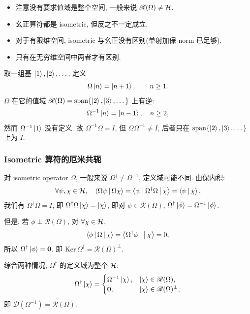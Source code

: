 \begin{itemize}
    \item 注意没有要求值域是整个空间, 一般来说 $\mathscr R(\Omega)\neq \mathcal{H}$.
    \item 幺正算符都是 isometric, 但反之不一定成立.
    \item 对于有限维空间, isometric 与幺正没有区别(单射加保 norm 已足够).
    \item 只有在无穷维空间中两者才有区别.
\end{itemize}

\begin{example}[单边平移算符]
取一组基 $\ket 1,\ket 2,\dots$, 定义
\begin{equation}
\Omega\ket n=\ket{n+1},\qquad n\geq 1.
\end{equation}
$\Omega$ 在它的值域 $\mathscr R(\Omega)=\mathrm{span}\{\ket 2,\ket 3,\dots\}$ 上有逆:
\begin{equation}
\Omega^{-1}\ket n=\ket{n-1},\quad n\geq 2,
\end{equation}
然而 $\Omega^{-1}\ket 1$ 没有定义. 故 $\Omega^{-1}\Omega=I$, 但 $\Omega\Omega^{-1}\neq I$, 后者只在 $\mathrm{span}\{\ket 2,\ket 3,\dots\}$ 上为 $I$.
\end{example}

\subsubsection{Isometric 算符的厄米共轭}

对 isometric operator $\Omega$, 一般来说 $\Omega^{\dagger}\neq \Omega^{-1}$, 定义域可能不同. 由保内积:
\begin{equation}
\forall \psi,\chi\in\mathcal{H},\quad\left\langle \Omega\psi \,\middle|\, \Omega\chi \right\rangle=\left\langle \psi \,\middle|\, \Omega^{\dagger}\Omega \,\middle|\, \chi \right\rangle=\left\langle \psi \,\middle|\, \chi \right\rangle,
\end{equation}
我们有 $\Omega^{\dagger}\Omega=I$, 即 $\Omega^{\dagger}\Omega\ket\chi=\ket\chi$, 即对 $\phi\in\mathscr R(\Omega)$, $\Omega^{\dagger}\ket\phi=\Omega^{-1}\ket\phi$.

但是, 若 $\phi\perp\mathscr R(\Omega)$, 对 $\forall \chi\in\mathcal{H}$,
\begin{equation}
\left\langle \phi \,\middle|\, \Omega \,\middle|\, \chi \right\rangle=\left\langle \Omega^{\dagger}\phi \,\middle|\,  \,\middle|\, \chi \right\rangle=0,
\end{equation}
所以 $\Omega^{\dagger}\ket\phi=\mathbf 0$. 即 $\mathrm{Ker}\,\Omega^{\dagger}=\mathscr R(\Omega)^{\perp}$.

综合两种情况, $\Omega^{\dagger}$ 的定义域为整个 $\mathcal{H}$:
\begin{equation}\label{eq:omega-dagger-def}
\Omega^{\dagger}\ket\chi=\begin{cases}\Omega^{-1}\ket\chi,& \ket\chi\in\mathscr R(\Omega),\\ \mathbf 0,& \ket\chi\in\mathscr R(\Omega)^{\perp},\end{cases}
\end{equation}
即 $\mathscr D(\Omega^{-1})=\mathscr R(\Omega)$.

